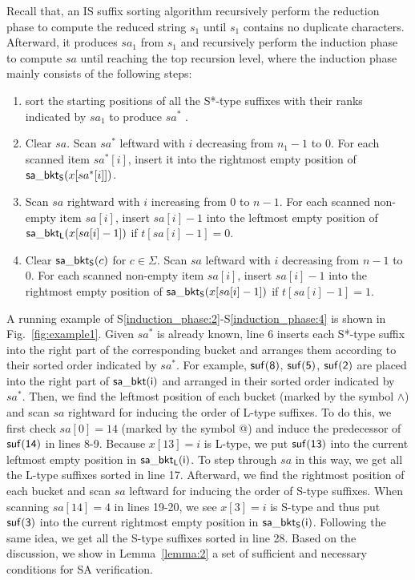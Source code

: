 \documentclass[10pt,journal,compsoc]{IEEEtran}
\begin{document}
Recall that, an IS suffix sorting algorithm recursively perform the reduction phase to compute the reduced string $s_1$ until $s_1$ contains no duplicate characters. Afterward, it produces $sa_1$ from $s_1$ and recursively perform the induction phase to compute $sa$ until reaching the top recursion level, where the induction phase mainly consists of the following steps:

\begin{enumerate}[S1'']
	\item sort the starting positions of all the S*-type suffixes with their ranks indicated by $sa_1$ to produce $sa^*$ \label{induction_phase:1}.

	\item Clear $sa$. Scan $sa^*$ leftward with $i$ decreasing from $n_1 - 1$ to $0$. For each scanned item $sa^*[i]$, insert it into the rightmost empty position of ${\sf sa\_bkt_S}(x[sa^*[i]])$. \label{induction_phase:2}
	
	\item Scan $sa$ rightward with $i$ increasing from $0$ to $n - 1$. For each scanned non-empty item $sa[i]$, insert $sa[i] - 1$ into the leftmost empty position of ${\sf sa\_bkt_L}(x[sa[i] - 1])$ if $t[sa[i] - 1] = 0$.\label{induction_phase:3}
	
	\item Clear ${\sf sa\_bkt_S}(c)$ for $c \in \Sigma$. Scan $sa$ leftward with $i$ decreasing from $n - 1$ to $0$. For each scanned non-empty item $sa[i]$, insert $sa[i] - 1$ into the rightmost empty position of ${\sf sa\_bkt_S}(x[sa[i] - 1])$ if $t[sa[i] - 1] = 1$.\label{induction_phase:4}
	
\end{enumerate}

A running example of S\ref{induction_phase:2}-S\ref{induction_phase:4} is shown in Fig.~\ref{fig:example1}. Given $sa^*$ is already known, line 6 inserts each S*-type suffix into the right part of the corresponding bucket and arranges them according to their sorted order indicated by $sa^*$. For example, $\sf suf(8)$, $\sf suf(5)$, $\sf suf(2)$ are placed into the right part of $\sf sa\_bkt(i)$ and arranged in their sorted order indicated by $sa^*$. Then, we find the leftmost position of each bucket (marked by the symbol $\wedge$) and scan $sa$ rightward for inducing the order of L-type suffixes. To do this, we first check $sa[0] = 14$ (marked by the symbol @) and induce the predecessor of $\sf suf(14)$ in lines 8-9. Because $x[13] = i$ is L-type, we put $\sf suf(13)$ into the current leftmost empty position in $\sf sa\_bkt_L(i)$. To step through $sa$ in this way, we get all the L-type suffixes sorted in line 17. Afterward, we find the rightmost position of each bucket and scan $sa$ leftward for inducing the order of S-type suffixes. When scanning $sa[14] = 4$ in lines 19-20, we see $x[3] = i$ is S-type and thus put $\sf suf(3)$ into the current rightmost empty position in $\sf sa\_bkt_S(i)$. Following the same idea, we get all the S-type suffixes sorted in line 28. Based on the discussion, we show in Lemma~\ref{lemma:2} a set of sufficient and necessary conditions for SA verification.
\end{document}
